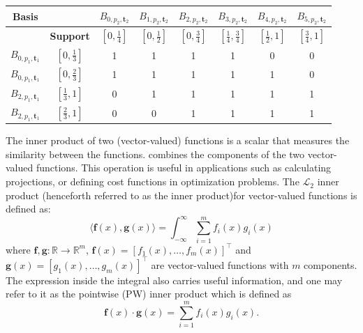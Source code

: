 \begin{indentedexample}
    \centering
    \begin{tabular}{c|c||c|c|c|c|c|c}
        \textbf{Basis} &  & $B_{0, p_2, \mathbf{t}_2}$ & $B_{1, p_2, \mathbf{t}_2}$ & $B_{2, p_2, \mathbf{t}_2}$ & $B_{3, p_2, \mathbf{t}_2}$ & $B_{4, p_2, \mathbf{t}_2}$ & $B_{5, p_2, \mathbf{t}_2}$ \\[5pt]
        \hline
        \rule{0pt}{2.5ex} & \textbf{Support} & $\left[0, \frac{1}{4}\right]$ & $\left[0, \frac{1}{2}\right]$ & $\left[0, \frac{3}{4}\right]$ & $\left[\frac{1}{4}, \frac{3}{4}\right]$ & $\left[\frac{1}{2}, 1\right]$ & $\left[\frac{3}{4}, 1\right]$ \\[5pt]
        \hline\hline
        \rule{0pt}{2.5ex}$B_{0, p_1, \mathbf{t}_1}$ & $\left[0, \frac{1}{3}\right]$ & 
        1 & 1 & 1 & 1 & 0 & 0 \\[5pt]\hline\rule{0pt}{2.5ex}
        $B_{0, p_1, \mathbf{t}_1}$ & $\left[0, \frac{2}{3}\right]$ &
        1 & 1 & 1 & 1 & 1 & 0 \\[5pt]\hline\rule{0pt}{2.5ex}
        $B_{2, p_1, \mathbf{t}_1}$ & $\left[\frac{1}{3}, 1\right]$ &
        0 & 1 & 1 & 1 & 1 & 1 \\[5pt]\hline\rule{0pt}{2.5ex}
        $B_{2, p_1, \mathbf{t}_1}$ & $\left[\frac{2}{3}, 1\right]$ & 
        0 & 0 & 1 & 1 & 1 & 1 \\[5pt]
    \end{tabular}
    \label{tab:ex-spline-supports}

\end{indentedexample}

The inner product of two (vector-valued) functions is a scalar that measures the similarity between the functions. combines the components of the two vector-valued functions. This operation is useful in applications such as calculating projections, or defining cost functions in optimization problems. The $\mathcal L_2$ inner product (henceforth referred to as the inner product)for vector-valued functions is defined as:
\begin{equation}
    \label{eq:dot-product}
    \langle\mathbf f(x), \mathbf g(x)\rangle = \int_{-\infty}^\infty\sum_{i=1}^m f_i(x) g_i(x)
\end{equation}
where $\mathbf f, \mathbf g: \mathbb{R} \to \mathbb{R}^m$, $\mathbf f(x) = [f_1(x), \ldots, f_m(x)]^\top$ and $\mathbf g(x) = [g_1(x), \ldots, g_m(x)]^\top$ are vector-valued functions with $m$ components. The expression inside the integral also carries useful information, and one may refer to it as the pointwise (PW) inner product which is defined as
\begin{equation}
    \label{eq:dot-product-pointwise}
    \mathbf f(x) \cdot \mathbf g(x) = \sum_{i=1}^m f_i(x) g_i(x).
\end{equation}

